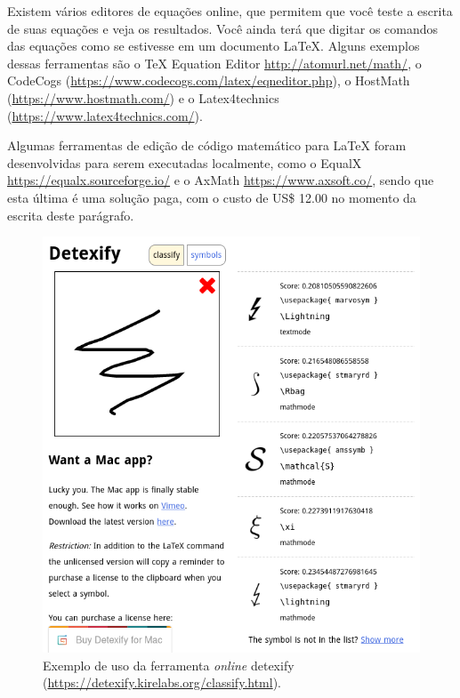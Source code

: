 Existem vários editores de equações online, que permitem que você teste a escrita de suas equações e veja os resultados. Você ainda terá que digitar os comandos das equações como se estivesse em um documento \LaTeX{}. Alguns exemplos dessas ferramentas são o \TeX{} Equation Editor \url{http://atomurl.net/math/}, o CodeCogs (\url{https://www.codecogs.com/latex/eqneditor.php}), o HostMath (\url{https://www.hostmath.com/}) e o Latex4technics (\url{https://www.latex4technics.com/}).

Algumas ferramentas de edição de código matemático para \LaTeX{} foram desenvolvidas para serem executadas localmente, como o EqualX \url{https://equalx.sourceforge.io/} e o AxMath \url{https://www.axsoft.co/}, sendo que esta última é uma solução paga, com o custo de US\$ 12.00 no momento da escrita deste parágrafo.

\begin{figure}[ht]
	\begin{center}
		\includegraphics[scale=0.5]{./imagens/capitulo4/detexify.png}
		
	\end{center}
	\caption{Exemplo de uso da ferramenta \textit{online} detexify (\url{https://detexify.kirelabs.org/classify.html}).}
	\label{fig:detexify}
\end{figure}

